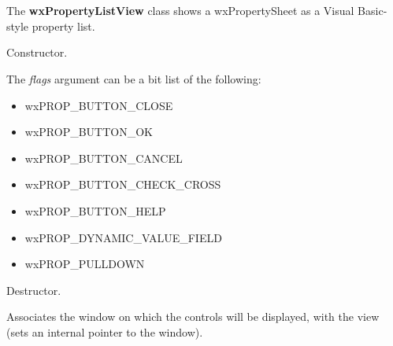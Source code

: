 \section{}\label{wxpropertylistview}

The {\bf wxPropertyListView} class shows a wxPropertySheet as a Visual Basic-style property list.






Constructor.

The {\it flags} argument can be a bit list of the following:

\begin{itemize}\itemsep=0pt
\item wxPROP\_BUTTON\_CLOSE
\item wxPROP\_BUTTON\_OK
\item wxPROP\_BUTTON\_CANCEL
\item wxPROP\_BUTTON\_CHECK\_CROSS
\item wxPROP\_BUTTON\_HELP
\item wxPROP\_DYNAMIC\_VALUE\_FIELD
\item wxPROP\_PULLDOWN
\end{itemize}



Destructor.

\label{wxpropertylistviewassociatepanel}


Associates the window on which the controls will be displayed, with the view (sets an internal pointer to the window).

\label{wxpropertylistviewbeginshowingproperty}


